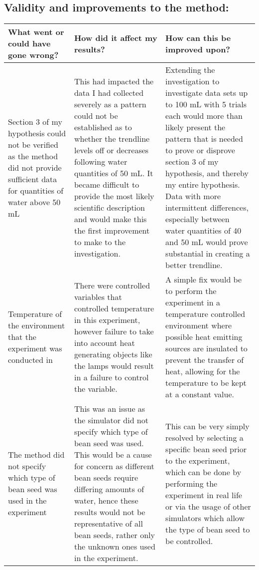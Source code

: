 \documentclass[11pt, a4]{article}
\begin{document}
		\subsection{Validity and improvements to the method:}
			\begin{longtable}{|m{3.5cm}|m{6cm}|m{5.7cm}|}
				
				\hline
				
				\textbf{What went or could have gone wrong?} & \textbf{How did it affect my results?} & \textbf{How can this be improved upon?}\\
				
				\hline
				
				Section 3 of my hypothesis could not be verified as the method did not provide sufficient data for quantities of water above 50 mL & 
				This had impacted the data I had collected severely as a pattern could not be established as to whether the trendline levels off or decreases following water quantities of 50 mL. It became difficult to provide the most likely scientific description and would make this the first improvement to make to the investigation. &
				Extending the investigation to investigate data sets up to 100 mL with 5 trials each would more than likely present the pattern that is needed to prove or disprove section 3 of my hypothesis, and thereby my entire hypothesis. Data with more intermittent differences, especially between water quantities of 40 and 50 mL would prove substantial in creating a better trendline.\\
				
				\hline
				
				Temperature of the environment that the experiment was conducted in &
				There were controlled variables that controlled temperature in this experiment, however failure to take into account heat generating objects like the lamps would result in a failure to control the variable. &
				A simple fix would be to perform the experiment in a temperature controlled environment where possible heat emitting sources are insulated to prevent the transfer of heat, allowing for the temperature to be kept at a constant value.\\
				
				\hline

				The method did not specify which type of bean seed was used in the experiment &
				This was an issue as the simulator did not specify which type of bean seed was used. This would be a cause for concern as different bean seeds require differing amounts of water, hence these results would not be representative of all bean seeds, rather only the unknown ones used in the experiment. &
				This can be very simply resolved by selecting a specific bean seed prior to the experiment, which can be done by performing the experiment in real life or via the usage of other simulators which allow the type of bean seed to be controlled.\\
				

\end{longtable}
\end{document}
